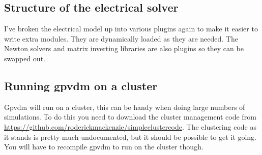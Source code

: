 \subsection{Structure of the electrical solver}
I've broken the electrical model up into various plugins again to make it easier to write extra modules.  They are dynamically loaded as they are needed.  The Newton solvers and matrix inverting libraries are also plugins so they can be swapped out.


\subsection{Running gpvdm on a cluster}
Gpvdm will run on a cluster, this can be handy when doing large numbers of simulations.  To do this you need to download the cluster management code from  \url{https://github.com/roderickmackenzie/simpleclustercode}.  The clustering code as it stands is pretty much undocumented, but it should be possible to get it going.  You will have to recompile gpvdm to run on the cluster though.

